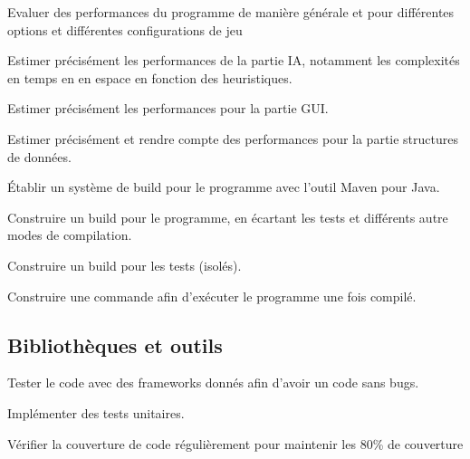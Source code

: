 \documentclass{article}
\begin{document}
\begin{nonfunctionnalneedbox}[F8: Performances]
    Evaluer des performances du programme de manière générale et pour différentes options et différentes configurations de jeu
    \begin{subneedbox}[F8.1: IA]
        Estimer précisément les performances de la partie IA, notamment les complexités en temps en en espace en fonction des heuristiques.
    \end{subneedbox}
    \begin{subneedbox}[F8.1: GUI]
        Estimer précisément les performances pour la partie GUI.
    \end{subneedbox}
    \begin{subneedbox}
        Estimer précisément et rendre compte des performances pour la partie structures de données.
    \end{subneedbox}
\end{nonfunctionnalneedbox}

\begin{nonfunctionnalneedbox}
    Établir un système de build pour le programme avec l'outil Maven pour Java. 
    \begin{subneedbox}
        Construire un build pour le programme, en écartant les tests et différents autre modes de compilation.
    \end{subneedbox}
    \begin{subneedbox}[F9.2: Tests]
        Construire un build pour les tests (isolés).
    \end{subneedbox}
    \begin{subneedbox}[F9.3: Exécution]
        Construire une commande afin d'exécuter le programme une fois compilé.
    \end{subneedbox}
\end{nonfunctionnalneedbox}

\subsection{Bibliothèques et outils}

\begin{nonfunctionnalneedbox}
    Tester le code avec des frameworks donnés afin d'avoir un code sans bugs.
    \begin{subneedbox}
        Implémenter des tests unitaires.
    \end{subneedbox}

    \begin{subneedbox}
        Vérifier la couverture de code régulièrement pour maintenir les 80\% de couverture
    \end{subneedbox}
\end{nonfunctionnalneedbox}
\end{document}
